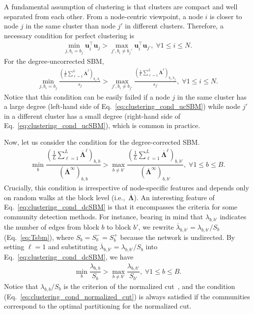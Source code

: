 \documentclass[12pt]{article} %
\def\ie{i.e.,~}
\def\vec#1{{\bm #1}}
\def\mat#1{\mathbf{#1}}
\begin{document}
A fundamental assumption of clustering is that clusters are compact and well separated from each other.
From a node-centric viewpoint, a node $i$ is closer to node $j$ in the same cluster than node $j'$ in different clusters.
Therefore, a necessary condition for perfect clustering is
\begin{align}
    \min_{j, b_i = b_j} \vec{u}^\top _i \vec{u} _j > \max_{j', b_i \neq b_j'} \vec{u}^\top _i \vec{u}_{j'},\; \forall 1\leq i \leq N.
\end{align}
For the degree-uncorrected SBM,
\begin{align}
    \label{eq:clustering_cond_ucSBM}
    \min_{j, b_i = b_j} \frac{\left(\frac{1}{L}\sum_{\ell=1}^L \mat{\overline \Lambda}^\ell \right)_{b_i, b_i}}{s_j} > \max_{j', b_i \neq b_{j'}} \frac{\left(\frac{1}{L}\sum_{\ell=1}^L \mat{\overline \Lambda}^\ell \right)_{b_i, b_{j'}}}{s_{j'}},\; \forall 1\leq i \leq N.
\end{align}
Notice that this condition can be easily failed if a node $j$ in the same cluster has a large degree (left-hand side of Eq.~\eqref{eq:clustering_cond_ucSBM}) while node $j'$ in a different cluster has a small degree (right-hand side of Eq.~\eqref{eq:clustering_cond_ucSBM}), which is common in practice.

Now, let us consider the condition for the degree-corrected SBM.
\begin{align}
    \label{eq:clustering_cond_dcSBM}
    \min_{b} \dfrac{\left(\frac{1}{L}\sum_{\ell=1}^L \mat{\overline \Lambda}^\ell \right)_{b, b}}{\left(\mat{\overline \Lambda}^\infty\right)_{b, b}} > \max_{b \neq b'} \dfrac{\left(\frac{1}{L}\sum_{\ell=1}^L \mat{\overline \Lambda}^\ell \right)_{b, b'}}{\left(\mat{\overline \Lambda}^\infty\right)_{b, b'}},\; \forall 1 \leq b \leq B.
\end{align}
Crucially, this condition is irrespective of node-specific features and depends only on random walks at the block level (\ie $\mat{\overline \Lambda}$).
An interesting feature of Eq.~\eqref{eq:clustering_cond_dcSBM} is that it encompasses the criteria for some community detection methods.
For instance, bearing in mind that $\lambda_{b,b'}$ indicates the number of edges from block $b$ to block $b'$, we rewrite $\overline \lambda_{b,b'} = \lambda_{b,b'} / S_b$ (Eq.~\eqref{eq:Tsbm}), where $S_b = S^{-}_b = S^{+}_b$ because the network is undirected.
By setting $\ell=1$ and substituting $\overline \lambda_{b,b'} = \lambda_{b,b'} / S_{b}$ into Eq.~\eqref{eq:clustering_cond_dcSBM}, we have
\begin{align}
    \label{eq:clustering_cond_normalized_cut}
    \min_{b} \dfrac{\lambda _{b, b}}{S_{b}} > \max_{b \neq b'} \dfrac{\lambda _{b, b'}}{S_{b'}},\; \forall 1 \leq b \leq B.
\end{align}
Notice that $\lambda _{b, b}/ S_{b}$ is the criterion of the normalized cut~\cite{Malik2000c}, and the condition (Eq.~\eqref{eq:clustering_cond_normalized_cut}) is always satisfied if the communities correspond to the optimal partitioning for the normalized cut.
\end{document}
